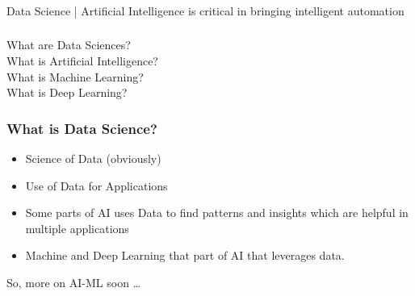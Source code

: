 


	



\begin{frame}[fragile]\frametitle{}
\begin{center}
{\Large Data Science | Artificial Intelligence is critical in bringing intelligent automation}
\end{center}
\end{frame}


\begin{frame}[fragile]\frametitle{}
\begin{center}
{\Large What are Data Sciences? \\ 
What is Artificial Intelligence? \\
What is Machine Learning? \\
What is Deep Learning?}
\end{center}
\end{frame}


\begin{frame}[fragile]\frametitle{What is Data Science?}

\begin{itemize}
\item Science of Data (obviously)
\item Use of Data for Applications
\item Some parts of AI uses Data to find patterns and insights which are helpful in multiple applications
\item Machine and Deep Learning that part of AI that leverages data.
\end{itemize}

So, more on AI-ML soon \ldots

\end{frame}

